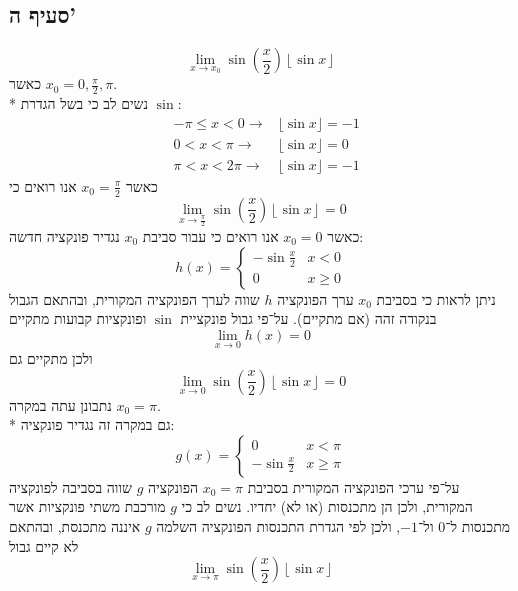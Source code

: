 \subsection{סעיף ה'}
\[
	\lim_{x \to x_0} \sin \left( \frac{x}{2} \right) \left\lfloor \sin x \right\rfloor
\]
כאשר $x_0 = 0, \frac{\pi}{2}, \pi$. \\*
נשים לב כי בשל הגדרת $\sin$:
\begin{align*}
	& -\pi \le x < 0 \rightarrow & \lfloor \sin x \rfloor = -1 \\
	& 0 < x < \pi \rightarrow & \lfloor \sin x \rfloor = 0 \\
	& \pi < x < 2\pi \rightarrow & \lfloor \sin x \rfloor = -1
\end{align*}
כאשר $x_0 = \frac{\pi}{2}$ אנו רואים כי
\[
	\lim_{x \to \frac{\pi}{2}} \sin \left( \frac{x}{2} \right) \left\lfloor \sin x \right\rfloor = 0
\]
כאשר $x_0 = 0$ אנו רואים כי עבור סביבת $x_0$ נגדיר פונקציה חדשה:
\[
	h(x) = \begin{cases}
		-\sin{\frac{x}{2}} & x < 0 \\
		0 & x \ge 0
	\end{cases}
\]
ניתן לראות כי בסביבת $x_0$ ערך הפונקציה $h$ שווה לערך הפונקציה המקורית, ובהתאם הגבול בנקודה זהה (אם מתקיים).
על־פי גבול פונקציית $\sin$ ופונקציות קבועות מתקיים
\[
	\lim_{x \to 0} h(x) = 0
\]
ולכן מתקיים גם
\[
	\lim_{x \to 0} \sin \left( \frac{x}{2} \right) \left\lfloor \sin x \right\rfloor = 0
\]
נתבונן עתה במקרה $x_0 = \pi$. \\*
גם במקרה זה נגדיר פונקציה:
\[
	g(x) = \begin{cases}
		0 & x < \pi \\
		-\sin{\frac{x}{2}} & x \ge \pi
	\end{cases}
\]
על־פי ערכי הפונקציה המקורית בסביבת $x_0 = \pi$ הפונקציה $g$ שווה בסביבה לפונקציה המקורית, ולכן הן מתכנסות (או לא) יחדיו.
נשים לב כי $g$ מורכבת משתי פונקציות אשר מתכנסות ל־$0$ ול־$-1$, ולכן לפי הגדרת התכנסות הפונקציה השלמה $g$ איננה מתכנסת, ובהתאם לא קיים גבול
\[
	\lim_{x \to \pi} \sin \left( \frac{x}{2} \right) \left\lfloor \sin x \right\rfloor
\]

